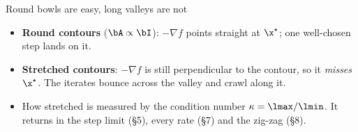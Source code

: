 \begin{frame}{Round bowls are easy, long valleys are not}
  \centering
  

  \vspace{4pt}
  \raggedright
  \begin{itemize}\small
    \item \textbf{Round contours} ($\bA\propto\bI$): $-\nabla f$ points straight at $\x^\star$; one well-chosen step lands on it.
    \item \textbf{Stretched contours}: $-\nabla f$ is still perpendicular to the contour, so it \emph{misses} $\x^\star$.
          The iterates bounce across the valley and crawl along it.
    \item How stretched is measured by the \alert{condition number} $\kappa = \lmax/\lmin$. It returns in the step limit (\S5),
          every rate (\S7) and the zig-zag (\S8).
  \end{itemize}
\end{frame}

